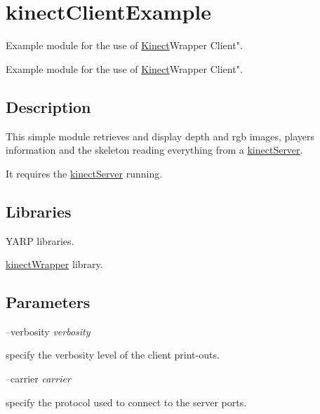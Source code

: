 \section{kinect\+Client\+Example}
\label{group__kinectClientExample}


Example module for the use of \hyperlink{group__kinectClientExample}{Kinect}Wrapper Client".  


Example module for the use of \hyperlink{group__kinectClientExample}{Kinect}Wrapper Client". 

\hypertarget{group__kinectServer_intro_sec}{}\subsection{Description}\label{group__kinectServer_intro_sec}
This simple module retrieves and display depth and rgb images, players information and the skeleton reading everything from a \hyperlink{group__kinectServer}{kinect\+Server}.

It requires the \hyperlink{group__kinectServer}{kinect\+Server} running.\hypertarget{group__kinectServer_lib_sec}{}\subsection{Libraries}\label{group__kinectServer_lib_sec}

\begin{DoxyItemize}
\item Y\+A\+R\+P libraries.
\item \hyperlink{group__kinectWrapper}{kinect\+Wrapper} library.
\end{DoxyItemize}\hypertarget{group__kinectServer_parameters_sec}{}\subsection{Parameters}\label{group__kinectServer_parameters_sec}
--verbosity {\itshape verbosity} 
\begin{DoxyItemize}
\item specify the verbosity level of the client print-\/outs.
\end{DoxyItemize}

--carrier {\itshape carrier} 
\begin{DoxyItemize}
\item specify the protocol used to connect to the server ports.
\end{DoxyItemize}

